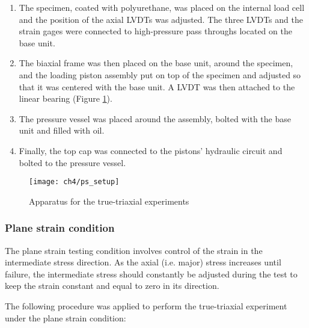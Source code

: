 \begin{enumerate}
    \item The specimen, coated with polyurethane, was placed on the internal load cell and the position of the axial LVDTs was adjusted. The three LVDTs and the strain gages were connected to high-pressure pass throughs located on the base unit. 
    \item The biaxial frame was then placed on the base unit, around the specimen, and the loading piston assembly put on top of the specimen and adjusted so that it was centered with the base unit. A LVDT was then attached to the linear bearing (Figure \ref{fig4:8}). 
    \item The pressure vessel was placed around the assembly, bolted with the base unit and filled with oil. 
    \item Finally, the top cap was connected to the pistons’ hydraulic circuit and bolted to the pressure vessel. 
\end{enumerate}


\begin{figure}[tb]
    \centering
    \texttt{[image: ch4/ps\_setup]}
    \captionsetup{justification=centering}
    \caption{Apparatus for the true-triaxial experiments}
    \label{fig4:8}
\end{figure} 

\subsubsection{Plane strain condition}

The plane strain testing condition involves control of the strain in the intermediate stress direction. As the axial (i.e. major) stress increases until failure, the intermediate stress should constantly be adjusted during the test to keep the strain constant and equal to zero in its direction.

The following procedure was applied to perform the true-triaxial experiment under the plane strain condition:  

